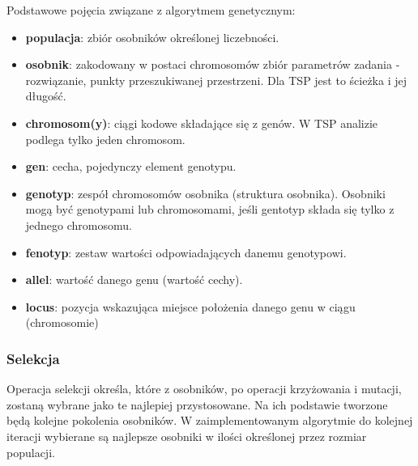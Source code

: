 \documentclass[12pt]{article}
\begin{document}
Podstawowe pojęcia związane z algorytmem genetycznym:
\begin{itemize}[noitemsep]
    \item \textbf{populacja}: zbiór osobników określonej liczebności.
    \item \textbf{osobnik}: zakodowany w postaci chromosomów zbiór parametrów zadania - rozwiązanie, punkty przeszukiwanej przestrzeni. Dla TSP jest to ścieżka i jej długość.
    \item \textbf{chromosom(y)}: ciągi kodowe składające się z genów. W TSP analizie podlega tylko jeden chromosom.
    \item \textbf{gen}: cecha, pojedynczy element genotypu.
    \item \textbf{genotyp}: zespół chromosomów osobnika (struktura osobnika). Osobniki mogą być genotypami lub chromosomami, jeśli gentotyp składa się tylko z jednego chromosomu.
    \item \textbf{fenotyp}: zestaw wartości odpowiadających danemu genotypowi.
    \item \textbf{allel}: wartość danego genu (wartość cechy).
    \item \textbf{locus}: pozycja wskazująca miejsce położenia danego genu w ciągu (chromosomie)
\end{itemize}

\subsubsection{Selekcja}
Operacja selekcji określa, które z osobników, po operacji krzyżowania i mutacji, zostaną wybrane jako te najlepiej przystosowane.
Na ich podstawie tworzone będą kolejne pokolenia osobników. W zaimplementowanym algorytmie do kolejnej iteracji wybierane są
najlepsze osobniki w ilości określonej przez rozmiar populacji.
\end{document}
